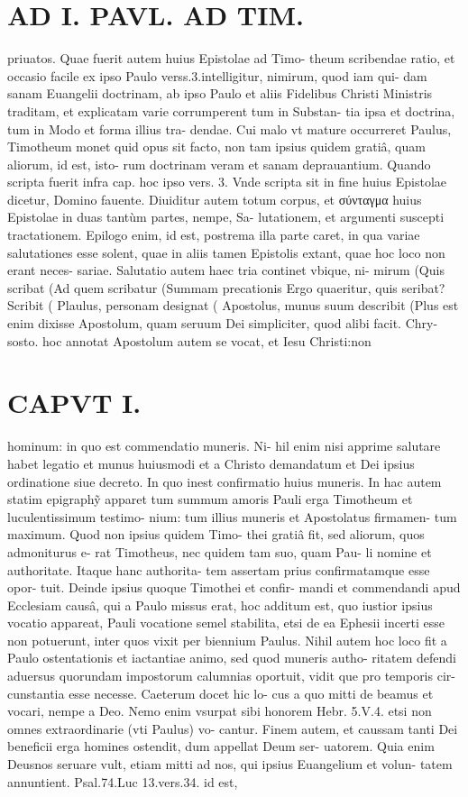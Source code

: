 \documentclass{article}
\begin{document}
\begin{pages}
\section*{AD I. PAVL. AD TIM. }
\marginpar{[ p.2 ]}\pstart priuatos. Quae fuerit autem huius Epistolae ad Timo- theum scribendae ratio, et occasio facile ex ipso Paulo verss.3.intelligitur, nimirum, quod iam qui- dam sanam Euangelii doctrinam, ab ipso Paulo et aliis Fidelibus Christi Ministris traditam, et explicatam varie corrumperent tum in Substan- tia ipsa et doctrina, tum in Modo et forma illius tra- dendae. Cui malo vt mature occurreret Paulus, Timotheum monet quid opus sit facto, non tam ipsius quidem gratiâ, quam aliorum, id est, isto- rum doctrinam veram et sanam deprauantium. Quando scripta fuerit infra cap. hoc ipso vers. 3. Vnde scripta sit in fine huius Epistolae dicetur, Domino fauente. Diuiditur autem totum corpus, et σύνταγμα huius Epistolae in duas tantùm partes, nempe, Sa- lutationem, et argumenti suscepti tractationem. Epilogo enim, id est, postrema illa parte caret, in qua variae salutationes esse solent, quae in aliis tamen Epistolis extant, quae hoc loco non erant neces- sariae. Salutatio autem haec tria continet vbique, ni- mirum (Quis scribat (Ad quem scribatur (Summam precationis Ergo quaeritur, quis seribat? Scribit ( Plaulus, personam designat ( Apostolus, munus suum describit (Plus est enim dixisse Apostolum, quam seruum Dei simpliciter, quod alibi facit. Chry- sosto. hoc annotat Apostolum autem se vocat, et Iesu Christi:non  \pend
\section*{CAPVT  I. }
\marginpar{[ p.3 ]}\pstart hominum: in quo est commendatio muneris. Ni- hil enim nisi apprime salutare habet legatio et munus huiusmodi et a Christo demandatum et Dei ipsius ordinatione siue decreto. In quo inest confirmatio huius muneris. In hac autem statim epigraphỹ apparet tum summum amoris Pauli erga Timotheum et luculentissimum testimo- nium: tum illius muneris et Apostolatus firmamen- tum maximum. Quod non ipsius quidem Timo- thei gratiâ fit, sed aliorum, quos admoniturus e- rat Timotheus, nec quidem tam suo, quam Pau- li nomine et authoritate. Itaque hanc authorita- tem assertam prius confirmatamque esse opor- tuit. Deinde ipsius quoque Timothei et confir- mandi et commendandi apud Ecclesiam causâ, qui a Paulo missus erat, hoc additum est, quo iustior ipsius vocatio appareat, Pauli vocatione semel stabilita, etsi de ea Ephesii incerti esse non potuerunt, inter quos vixit per biennium Paulus. Nihil autem hoc loco fit a Paulo ostentationis et iactantiae animo, sed quod muneris autho- ritatem defendi aduersus quorundam impostorum calumnias oportuit, vidit que pro temporis cir- cunstantia esse necesse. Caeterum docet hic lo- cus a quo mitti de beamus et vocari, nempe a Deo. Nemo enim vsurpat sibi honorem Hebr. 5.V.4. etsi non omnes extraordinarie (vti Paulus) vo- cantur. Finem autem, et caussam tanti Dei beneficii erga homines ostendit, dum appellat Deum ser- uatorem. Quia enim Deusnos seruare vult, etiam mitti ad nos, qui ipsius Euangelium et volun- tatem annuntient. Psal.74.Luc 13.vers.34. id est,  \pend

\end{pages}
\end{document}
